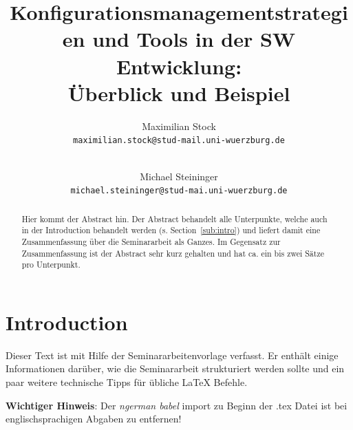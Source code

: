 \documentclass[runningheads,a4paper]{uwsese}
\begin{document}
\mainmatter

\title{Konfigurationsmanagementstrategien und Tools in der SW Entwicklung:\\ Überblick und Beispiel}


\author{
  Maximilian Stock\\
  \texttt{maximilian.stock@stud-mail.uni-wuerzburg.de}\\
  \and\\
  Michael Steininger\\
  \texttt{michael.steininger@stud-mai.uni-wuerzburg.de}
}
%



\maketitle


\begin{abstract}
	Hier kommt der Abstract hin. Der Abstract behandelt alle Unterpunkte, welche auch in der Introduction behandelt werden (s. Section~\ref{sub:intro}) und liefert damit eine Zusammenfassung über die Seminararbeit als Ganzes. Im Gegensatz zur Zusammenfassung ist der Abstract sehr kurz gehalten und hat ca. ein bis zwei Sätze pro Unterpunkt.
\end{abstract}


\section{Introduction}

Dieser Text ist mit Hilfe der Seminararbeitenvorlage verfasst. Er enthält einige Informationen darüber, wie die Seminararbeit strukturiert werden sollte und ein paar weitere technische Tipps für übliche LaTeX Befehle.

\textbf{Wichtiger Hinweis}: Der \emph{ngerman babel} import zu Beginn der .tex Datei ist bei englischsprachigen Abgaben zu entfernen!
\end{document}
